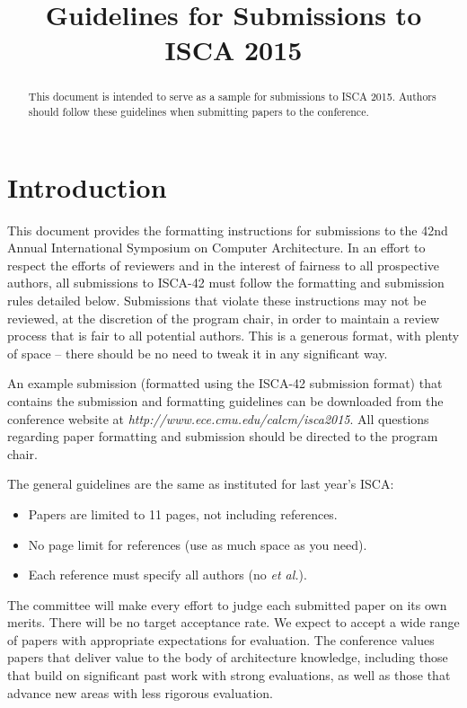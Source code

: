 \documentclass[pageno]{jpaper}
\begin{document}
\title{
Guidelines for Submissions to ISCA 2015}

\date{}
\maketitle


\begin{abstract}
This document is intended to serve as a sample for submissions to
ISCA 2015.  Authors should follow these guidelines when submitting
papers to the conference.
\end{abstract}

\section{Introduction}

This document provides the formatting instructions for submissions to
the 42nd Annual International Symposium on Computer Architecture. In
an effort to respect the efforts of reviewers and in the interest of
fairness to all prospective authors, all submissions to ISCA-42 must
follow the formatting and submission rules detailed below.
Submissions that violate these instructions may not be reviewed, at
the discretion of the program chair, in order to maintain a review
process that is fair to all potential authors.  This is a generous
format, with plenty of space -- there should be no need to tweak it in
any significant way.

An example submission (formatted using the ISCA-42 submission format)
that contains the submission and formatting guidelines can be
downloaded from the conference website at {\em
  http://www.ece.cmu.edu/calcm/isca2015}.  All questions regarding
paper formatting and submission should be directed to the program
chair.

The general guidelines are the same as instituted for last year's ISCA:
\begin{itemize}
\item Papers are limited to 11 pages, not including references.
\item No page limit for references (use as much space as you need).
\item Each reference must specify all authors (no {\em et al.}).
\end{itemize}

 The committee will make every effort
to judge each submitted paper on its own merits. There will be no
target acceptance rate. We expect to accept a wide range of papers
with appropriate expectations for evaluation. The conference values
papers that deliver value to the body of architecture knowledge,
including those that build on significant past work with strong
evaluations, as well as those that advance new areas with less
rigorous evaluation.
\end{document}
